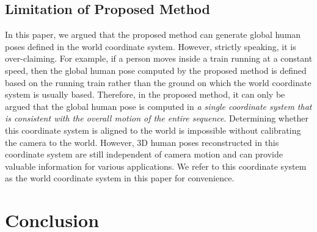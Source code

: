 \documentclass[10pt,twocolumn,letterpaper]{article}
\begin{document}
\subsection{Limitation of Proposed Method}

In this paper, we argued that the proposed method can generate global human poses defined in the world coordinate system. However, strictly speaking, it is over-claiming. For example, if a person moves inside a train running at a constant speed, then the global human pose computed by the proposed method is defined based on the running train rather than the ground on which the world coordinate system is usually based. Therefore, in the proposed method, it can only be argued that the global human pose is computed in \emph{a single coordinate system that is consistent with the overall motion of the entire sequence}. Determining whether this coordinate system is aligned to the world is impossible without calibrating the camera to the world. However, 3D human poses reconstructed in this coordinate system are still independent of camera motion and can provide valuable information for various applications. We refer to this coordinate system as the world coordinate system in this paper for convenience.



\section{Conclusion}
\end{document}
